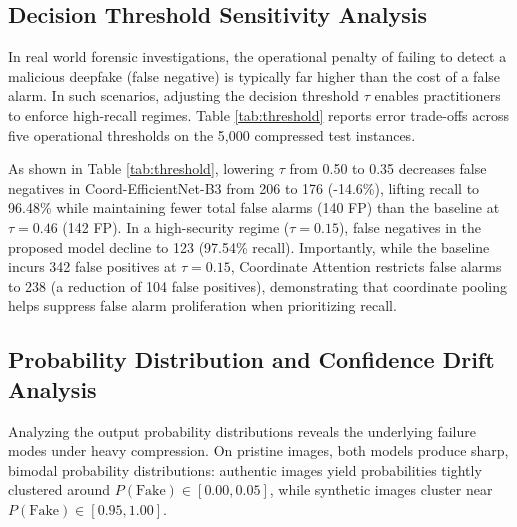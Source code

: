 \documentclass[conference]{IEEEtran}
\begin{document}
\subsection{Decision Threshold Sensitivity Analysis}
In real world forensic investigations, the operational penalty of failing to detect a malicious deepfake (false negative) is typically far higher than the cost of a false alarm. In such scenarios, adjusting the decision threshold $\tau$ enables practitioners to enforce high-recall regimes. Table \ref{tab:threshold} reports error trade-offs across five operational thresholds on the 5,000 compressed test instances.

\begin{table}[htbp]
\caption{Decision Threshold Sensitivity on Compressed Test Set}
\label{tab:threshold}
\centering
{}
\end{table}

As shown in Table \ref{tab:threshold}, lowering $\tau$ from 0.50 to 0.35 decreases false negatives in Coord-EfficientNet-B3 from 206 to 176 (-14.6\%), lifting recall to 96.48\% while maintaining fewer total false alarms (140 FP) than the baseline at $\tau = 0.46$ (142 FP). In a high-security regime ($\tau = 0.15$), false negatives in the proposed model decline to 123 (97.54\% recall). Importantly, while the baseline incurs 342 false positives at $\tau = 0.15$, Coordinate Attention restricts false alarms to 238 (a reduction of 104 false positives), demonstrating that coordinate pooling helps suppress false alarm proliferation when prioritizing recall.

\subsection{Probability Distribution and Confidence Drift Analysis}
Analyzing the output probability distributions reveals the underlying failure modes under heavy compression. On pristine images, both models produce sharp, bimodal probability distributions: authentic images yield probabilities tightly clustered around $P(\text{Fake}) \in [0.00, 0.05]$, while synthetic images cluster near $P(\text{Fake}) \in [0.95, 1.00]$.
\end{document}
